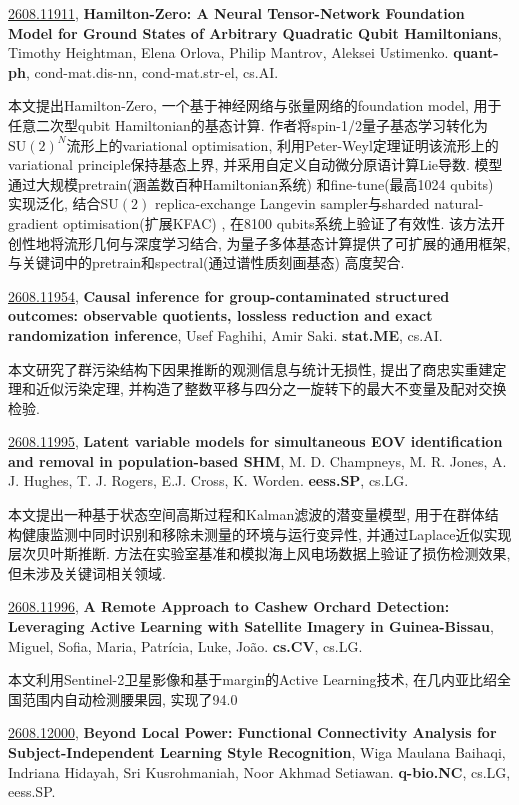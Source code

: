 \documentclass[9pt, a4paper]{article}
\theoremstyle{plain}
\theoremstyle{definition}
\theoremstyle{remark}
\newcommand{\arxivwithtarget}[3]{\hypertarget{#1}{}\href{https://arxiv.org/abs/#1}{#1}, \textbf{\textcolor{arxivblue}{#2}}, #3. }
\begin{document}
\arxivwithtarget{2608.11911}{Hamilton-Zero: A Neural Tensor-Network Foundation Model for Ground States of Arbitrary Quadratic Qubit Hamiltonians}{Timothy Heightman, Elena Orlova, Philip Mantrov, Aleksei Ustimenko}\textbf{quant-ph}, cond-mat.dis-nn, cond-mat.str-el, cs.AI.

本文提出Hamilton-Zero, 一个基于神经网络与张量网络的foundation model, 用于任意二次型qubit Hamiltonian的基态计算. 作者将spin-1/2量子基态学习转化为$\mathrm{SU}(2)^N$流形上的variational optimisation, 利用Peter-Weyl定理证明该流形上的variational principle保持基态上界, 并采用自定义自动微分原语计算Lie导数. 模型通过大规模pretrain(涵盖数百种Hamiltonian系统) 和fine-tune(最高1024 qubits) 实现泛化, 结合$\mathrm{SU}(2)$ replica-exchange Langevin sampler与sharded natural-gradient optimisation(扩展KFAC) , 在8100 qubits系统上验证了有效性. 该方法开创性地将流形几何与深度学习结合, 为量子多体基态计算提供了可扩展的通用框架, 与关键词中的pretrain和spectral(通过谱性质刻画基态) 高度契合.


\arxivwithtarget{2608.11954}{Causal inference for group-contaminated structured outcomes: observable quotients, lossless reduction and exact randomization inference}{Usef Faghihi, Amir Saki}\textbf{stat.ME}, cs.AI.

本文研究了群污染结构下因果推断的观测信息与统计无损性, 提出了商忠实重建定理和近似污染定理, 并构造了整数平移与四分之一旋转下的最大不变量及配对交换检验.


\arxivwithtarget{2608.11995}{Latent variable models for simultaneous EOV identification and removal in population-based SHM}{M. D. Champneys, M. R. Jones, A. J. Hughes, T. J. Rogers, E.J. Cross, K. Worden}\textbf{eess.SP}, cs.LG.

本文提出一种基于状态空间高斯过程和Kalman滤波的潜变量模型, 用于在群体结构健康监测中同时识别和移除未测量的环境与运行变异性, 并通过Laplace近似实现层次贝叶斯推断. 方法在实验室基准和模拟海上风电场数据上验证了损伤检测效果, 但未涉及关键词相关领域.


\arxivwithtarget{2608.11996}{A Remote Approach to Cashew Orchard Detection: Leveraging Active Learning with Satellite Imagery in Guinea-Bissau}{Miguel, Sofia, Maria, Patrícia, Luke, João}\textbf{cs.CV}, cs.LG.

本文利用Sentinel-2卫星影像和基于margin的Active Learning技术, 在几内亚比绍全国范围内自动检测腰果园, 实现了94.0%


\arxivwithtarget{2608.12000}{Beyond Local Power: Functional Connectivity Analysis for Subject-Independent Learning Style Recognition}{Wiga Maulana Baihaqi, Indriana Hidayah, Sri Kusrohmaniah, Noor Akhmad Setiawan}\textbf{q-bio.NC}, cs.LG, eess.SP.
\end{document}
